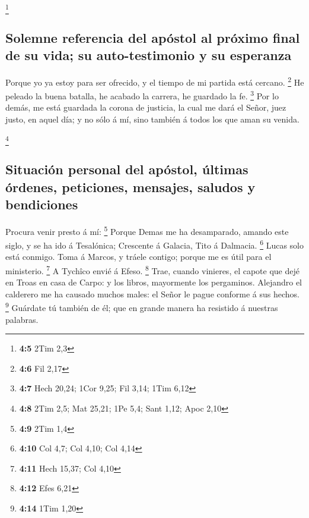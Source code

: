 \footnote{\textbf{4:5} 2Tim 2,3}

\hypertarget{solemne-referencia-del-apuxf3stol-al-pruxf3ximo-final-de-su-vida-su-auto-testimonio-y-su-esperanza}{%
\subsection{Solemne referencia del apóstol al próximo final de su vida;
su auto-testimonio y su
esperanza}\label{solemne-referencia-del-apuxf3stol-al-pruxf3ximo-final-de-su-vida-su-auto-testimonio-y-su-esperanza}}

 Porque yo ya estoy para ser ofrecido, y el tiempo de mi
partida está cercano. \footnote{\textbf{4:6} Fil 2,17}  He
peleado la buena batalla, he acabado la carrera, he guardado la fe.
\footnote{\textbf{4:7} Hech 20,24; 1Cor 9,25; Fil 3,14; 1Tim 6,12}
 Por lo demás, me está guardada la corona de justicia, la
cual me dará el Señor, juez justo, en aquel día; y no sólo á mí, sino
también á todos los que aman su venida.

\footnote{\textbf{4:8} 2Tim 2,5; Mat 25,21; 1Pe 5,4; Sant 1,12; Apoc
  2,10}

\hypertarget{situaciuxf3n-personal-del-apuxf3stol-uxfaltimas-uxf3rdenes-peticiones-mensajes-saludos-y-bendiciones}{%
\subsection{Situación personal del apóstol, últimas órdenes, peticiones,
mensajes, saludos y
bendiciones}\label{situaciuxf3n-personal-del-apuxf3stol-uxfaltimas-uxf3rdenes-peticiones-mensajes-saludos-y-bendiciones}}

 Procura venir presto á mí: \footnote{\textbf{4:9} 2Tim
  1,4}  Porque Demas me ha desamparado, amando este
siglo, y se ha ido á Tesalónica; Crescente á Galacia, Tito á Dalmacia.
\footnote{\textbf{4:10} Col 4,7; Col 4,10; Col 4,14} 
Lucas solo está conmigo. Toma á Marcos, y tráele contigo; porque me es
útil para el ministerio. \footnote{\textbf{4:11} Hech 15,37; Col 4,10}
 A Tychîco envié á Efeso. \footnote{\textbf{4:12} Efes
  6,21}  Trae, cuando vinieres, el capote que dejé en
Troas en casa de Carpo: y los libros, mayormente los pergaminos.
 Alejandro el calderero me ha causado muchos males: el
Señor le pague conforme á sus hechos. \footnote{\textbf{4:14} 1Tim 1,20}
 Guárdate tú también de él; que en grande manera ha
resistido á nuestras palabras.

